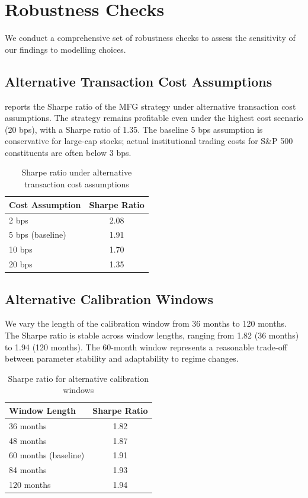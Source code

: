 \section{Robustness Checks}
\label{sec:emp-robustness}

We conduct a comprehensive set of robustness checks to assess the sensitivity of
our findings to modelling choices.

\subsection{Alternative Transaction Cost Assumptions}

 reports the Sharpe ratio of the MFG strategy under
alternative transaction cost assumptions. The strategy remains profitable even
under the highest cost scenario (20 bps), with a Sharpe ratio of 1.35. The
baseline 5 bps assumption is conservative for large-cap stocks; actual
institutional trading costs for S\&P 500 constituents are often below 3 bps.

\begin{table}[ht]
\centering
\caption{Sharpe ratio under alternative transaction cost assumptions}
\label{tab:robustness-costs}
\begin{tabular}{lc}
\toprule
\textbf{Cost Assumption} & \textbf{Sharpe Ratio} \\
\midrule
2 bps & 2.08 \\
5 bps (baseline) & 1.91 \\
10 bps & 1.70 \\
20 bps & 1.35 \\
\bottomrule
\end{tabular}
\end{table}

\subsection{Alternative Calibration Windows}

We vary the length of the calibration window from 36 months to 120 months. The
Sharpe ratio is stable across window lengths, ranging from 1.82 (36 months) to
1.94 (120 months). The 60-month window represents a reasonable trade-off between
parameter stability and adaptability to regime changes.

\begin{table}[ht]
\centering
\caption{Sharpe ratio for alternative calibration windows}
\label{tab:robustness-windows}
\begin{tabular}{lc}
\toprule
\textbf{Window Length} & \textbf{Sharpe Ratio} \\
\midrule
36 months & 1.82 \\
48 months & 1.87 \\
60 months (baseline) & 1.91 \\
84 months & 1.93 \\
120 months & 1.94 \\
\bottomrule
\end{tabular}
\end{table}

